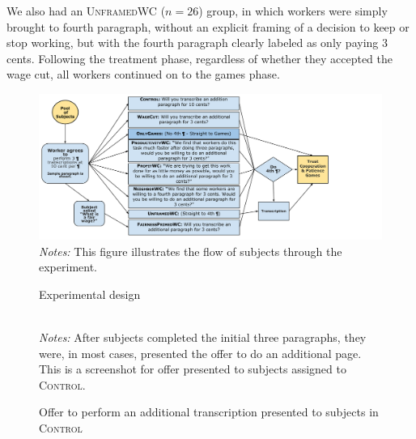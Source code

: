 \documentclass[11pt]{article}
\begin{document}
We also had an \textsc{UnframedWC} ($n = 26$) group, in which workers were simply brought to fourth paragraph, without an explicit framing of a decision to keep or stop working, but with the fourth paragraph clearly labeled as only paying 3 cents.   
Following the treatment phase, regardless of whether they accepted the wage cut, all workers continued on to the games phase.

\begin{figure}
\caption{Experimental design \label{fig:exp}}
\centering
\begin{minipage}{1.00 \linewidth}
\includegraphics[width = \linewidth]{./media/exp.pdf} 
\\
\footnotesize 
\emph{Notes:} This figure illustrates the flow of subjects through the experiment. 
\end{minipage}
\end{figure}

\begin{figure}[b!]
  \caption{Offer to perform an additional transcription presented to subjects in \textsc{Control} \label{fig:G1}}
\centering
\begin{minipage}{0.85\linewidth}
\\
\footnotesize \emph{Notes:} After subjects completed the initial three paragraphs, they were, in most cases, presented the offer to do an additional page.
This is a screenshot for offer presented to subjects assigned to \textsc{Control}.
\end{minipage}
\end{figure}
 
\end{document}

